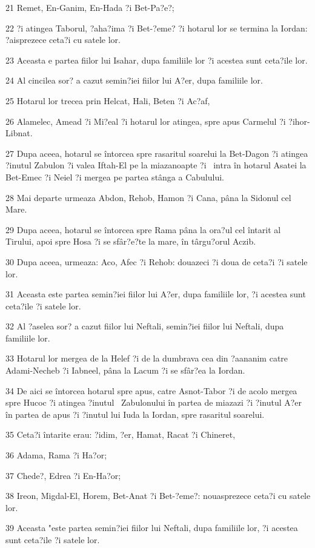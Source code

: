 \par 21 Remet, En-Ganim, En-Hada ?i Bet-Pa?e?;
\par 22 ?i atingea Taborul, ?aha?ima ?i Bet-?eme? ?i hotarul lor se termina la Iordan: ?aisprezece ceta?i cu satele lor.
\par 23 Aceasta e partea fiilor lui Isahar, dupa familiile lor ?i acestea sunt ceta?ile lor.
\par 24 Al cincilea sor? a cazut semin?iei fiilor lui A?er, dupa familiile lor.
\par 25 Hotarul lor trecea prin Helcat, Hali, Beten ?i Ac?af,
\par 26 Alamelec, Amead ?i Mi?eal ?i hotarul lor atingea, spre apus Carmelul ?i ?ihor-Libnat.
\par 27 Dupa aceea, hotarul se întorcea spre rasaritul soarelui la Bet-Dagon ?i atingea ?inutul Zabulon ?i valea Iftah-El pe la miazanoapte ?i  intra în hotarul Asatei la Bet-Emec ?i Neiel ?i mergea pe partea stânga a Cabulului.
\par 28 Mai departe urmeaza Abdon, Rehob, Hamon ?i Cana, pâna la Sidonul cel Mare.
\par 29 Dupa aceea, hotarul se întorcea spre Rama pâna la ora?ul cel întarit al Tirului, apoi spre Hosa ?i se sfâr?e?te la mare, în târgu?orul Aczib.
\par 30 Dupa aceea, urmeaza: Aco, Afec ?i Rehob: douazeci ?i doua de ceta?i ?i satele lor.
\par 31 Aceasta este partea semin?iei fiilor lui A?er, dupa familiile lor, ?i acestea sunt ceta?ile ?i satele lor.
\par 32 Al ?aselea sor? a cazut fiilor lui Neftali, semin?iei fiilor lui Neftali, dupa familiile lor.
\par 33 Hotarul lor mergea de la Helef ?i de la dumbrava cea din ?aananim catre Adami-Necheb ?i Iabneel, pâna la Lacum ?i se sfâr?ea la Iordan.
\par 34 De aici se întorcea hotarul spre apus, catre Asnot-Tabor ?i de acolo mergea spre Hucoc ?i atingea ?inutul  Zabulonului în partea de miazazi ?i ?inutul A?er în partea de apus ?i ?inutul lui Iuda la Iordan, spre rasaritul soarelui.
\par 35 Ceta?i întarite erau: ?idim, ?er, Hamat, Racat ?i Chineret,
\par 36 Adama, Rama ?i Ha?or;
\par 37 Chede?, Edrea ?i En-Ha?or;
\par 38 Ireon, Migdal-El, Horem, Bet-Anat ?i Bet-?eme?: nouasprezece ceta?i cu satele lor.
\par 39 Aceasta "este partea semin?iei fiilor lui Neftali, dupa familiile lor, ?i acestea sunt ceta?ile ?i satele lor.
